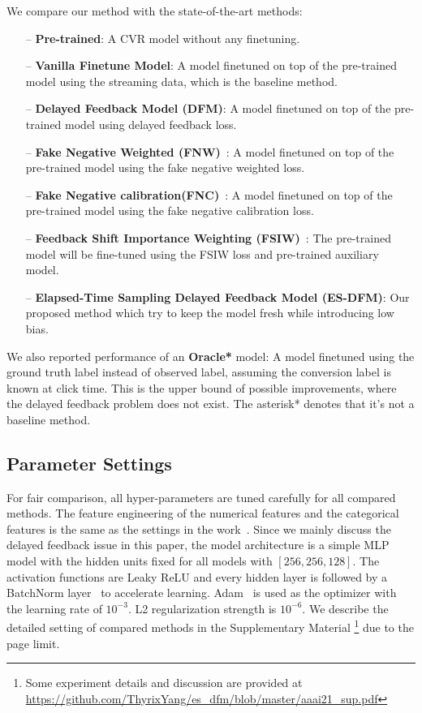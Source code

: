 \documentclass[letterpaper]{article} %
\newcommand{\modelname}{Elapsed-Time Sampling Delayed Feedback Model}
\newcommand{\modelnameabb}{ES-DFM}
\begin{document}
We compare our method with the state-of-the-art methods:

\begin{itemize}

\item[--] \textbf{Pre-trained}: A CVR model without any finetuning.

\item[--] \textbf{Vanilla Finetune Model}: A model finetuned on top of the pre-trained model using the streaming data, which is the baseline method.

\item[--] \textbf{Delayed Feedback Model (DFM)}\cite{DFM}: A model finetuned on top of the pre-trained model using delayed feedback loss.

\item[--] \textbf{Fake Negative Weighted (FNW)}~\cite{FNW}: A model finetuned on top of the pre-trained model using the fake negative weighted loss.

\item[--] \textbf{Fake Negative calibration(FNC)}~\cite{FNW}: A model finetuned on top of the pre-trained model using the fake negative calibration loss.

\item[--] \textbf{Feedback Shift Importance Weighting (FSIW)}~\cite{FSIW}: The pre-trained model will be fine-tuned using the FSIW loss and pre-trained auxiliary model.

\item[--] \textbf{\modelname{} (\modelnameabb{})}: Our proposed method which try to keep the model fresh while introducing low bias.

\end{itemize}

We also reported performance of an \textbf{Oracle*} model: A model finetuned using the ground truth label instead of observed label, assuming the conversion label is known at click time. This is the upper bound of possible improvements, where the delayed feedback problem does not exist. The asterisk* denotes that it's not a baseline method.

\subsection{Parameter Settings}
For fair comparison, all hyper-parameters are tuned carefully for all compared methods. The feature engineering of the numerical features and the categorical features is the same as the settings in the work~\cite{DFM}. Since we mainly discuss the delayed feedback issue in this paper, the model architecture is a simple MLP model with the hidden units fixed for all models with $[256,256,128]$. The activation functions are Leaky ReLU and every hidden layer is followed by a BatchNorm layer~\cite{ioffe2015batch} to accelerate learning. Adam~\cite{kingma:adam} is used as the optimizer with the learning rate of $10^{-3}$. L2 regularization strength is $10^{-6}$. We describe the detailed setting of compared methods in the Supplementary Material \footnote{\label{supp}Some experiment details and discussion are provided at \url{https://github.com/ThyrixYang/es_dfm/blob/master/aaai21_sup.pdf}} due to the page limit.
\end{document}
